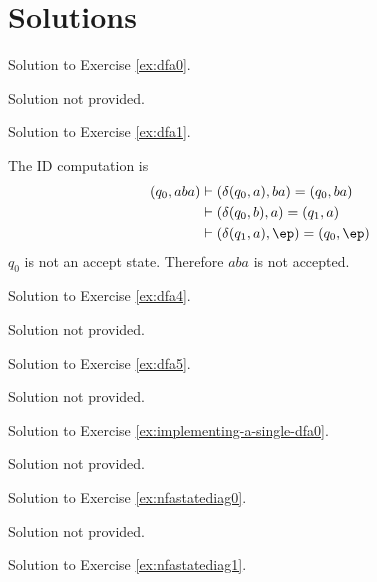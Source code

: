 
\newpage
\section*{Solutions}
Solution to Exercise \ref{ex:dfa0}.


    Solution not provided.
    

\newpage

Solution to Exercise \ref{ex:dfa1}.

  The ID computation is
  \begin{align*}
    (q_0, aba)
    &\vdash (\delta(q_0, a), ba) = (q_0, ba) \\ 
    &\vdash (\delta(q_0, b), a) = (q_1, a) \\
    &\vdash (\delta(q_1, a), \ep) = (q_0, \ep)
  \end{align*}
  $q_0$ is not an accept state. Therefore $aba$ is not accepted.


\newpage

Solution to Exercise \ref{ex:dfa4}.


    Solution not provided.
    

\newpage

Solution to Exercise \ref{ex:dfa5}.


    Solution not provided.
    

\newpage

Solution to Exercise \ref{ex:implementing-a-single-dfa0}.


    Solution not provided.
    

\newpage

Solution to Exercise \ref{ex:nfastatediag0}.


    Solution not provided.
    

\newpage

Solution to Exercise \ref{ex:nfastatediag1}.

